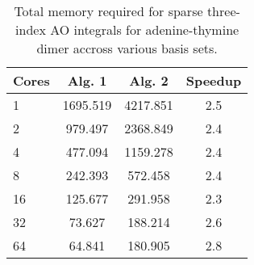 \begingroup
\begin{table}[H]
\centering
\renewcommand{\baselinestretch}{1}
\caption{Total memory required for sparse three-index AO integrals for adenine-thymine dimer accross various basis sets.}
\begin{tabular}{l ccc}
\multicolumn{1}{l}{\textbf{Cores}} &
\multicolumn{1}{c}{\textbf{Alg. 1}} &
\multicolumn{1}{c}{\textbf{Alg. 2}} &
\multicolumn{1}{c}{\textbf{Speedup}} \\
\hline

1   &1695.519&  4217.851&   2.5\\
2   & 979.497&  2368.849&   2.4\\
4   & 477.094&  1159.278&   2.4\\
8   & 242.393&   572.458&   2.4\\
16  & 125.677&   291.958&   2.3\\
32  &  73.627&   188.214&   2.6\\
64  &  64.841&   180.905&   2.8\\

\end{tabular}
\end{table}
\endgroup 



